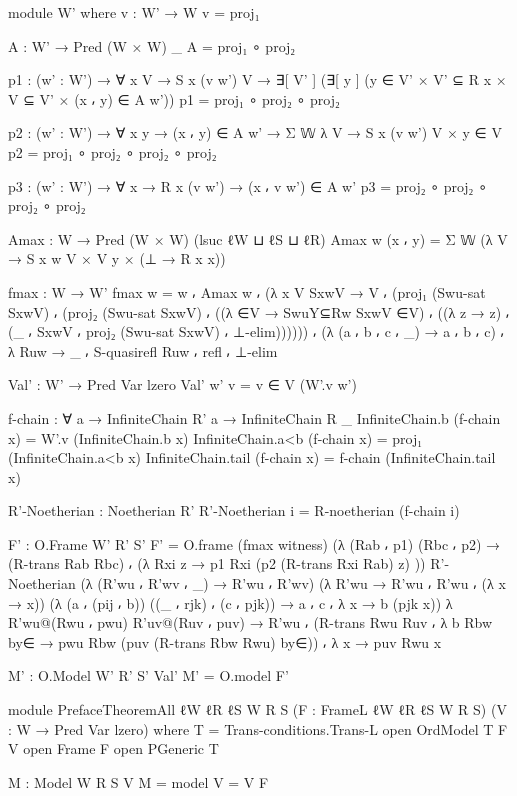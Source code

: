 \begin{spverbatim}
  module W' where
    v : W' → W
    v = proj₁

    A : W' → Pred (W × W) _
    A = proj₁ ∘ proj₂

    p1 : (w' : W')
      → ∀ {x V} → S x (v w') V
      → ∃[ V' ] (∃[ y ]
      (y ∈ V' × V' ⊆ R x × V ⊆ V' × (x ⸴ y) ∈ A w'))
    p1 = proj₁ ∘ proj₂ ∘ proj₂

    p2 : (w' : W') → ∀ {x y} → (x ⸴ y) ∈ A w'
      → Σ 𝕎 λ V → S x (v w') V × y ∈ V
    p2 = proj₁ ∘ proj₂ ∘ proj₂ ∘ proj₂

    p3 : (w' : W') → ∀ {x} → R x (v w') → (x ⸴ v w') ∈ A w'
    p3 = proj₂ ∘ proj₂ ∘ proj₂ ∘ proj₂

  Amax : W → Pred (W × W) (lsuc ℓW ⊔ ℓS ⊔ ℓR)
  Amax w (x ⸴ y) = Σ 𝕎 (λ V → S x w V × V y × (⊥ → R x x))

  fmax : W → W'
  fmax w = w ⸴ Amax w ⸴
       (λ { {x} {V} SxwV → V ⸴ (proj₁ (Swu-sat SxwV) ⸴ (proj₂ (Swu-sat SxwV)
         ⸴ ((λ {∈V → SwuY⊆Rw SxwV ∈V}) ⸴ ((λ z → z) ⸴ (_ ⸴ SxwV
         ⸴ proj₂ (Swu-sat SxwV) ⸴ ⊥-elim)))))})
    ⸴ (λ {(a ⸴ b ⸴ c ⸴ _) → a ⸴ b ⸴ c})
    ⸴ λ { Ruw → _ ⸴ S-quasirefl Ruw ⸴ refl ⸴ ⊥-elim}

  Val' : W' → Pred Var lzero
  Val' w' v = v ∈ V (W'.v w')

  f-chain : ∀ {a} → InfiniteChain R' a → InfiniteChain R _
  InfiniteChain.b (f-chain x) = W'.v (InfiniteChain.b x)
  InfiniteChain.a<b (f-chain x) = proj₁ (InfiniteChain.a<b x)
  InfiniteChain.tail (f-chain x) = f-chain (InfiniteChain.tail x)

  R'-Noetherian : Noetherian R'
  R'-Noetherian i = R-noetherian (f-chain i)

  F' : O.Frame W' R' S'
  F' = O.frame
    (fmax witness)
    (λ { (Rab ⸴ p1) (Rbc ⸴ p2) → (R-trans Rab Rbc) ⸴
      (λ {Rxi z → p1 Rxi (p2 (R-trans Rxi Rab) z) })})
    R'-Noetherian
    (λ { (R'wu ⸴ R'wv ⸴ _) → R'wu ⸴ R'wv})
    (λ {R'wu → R'wu ⸴ R'wu ⸴ (λ {x → x})})
    (λ { (a ⸴ (pij ⸴ b)) ((_ ⸴ rjk) ⸴ (c ⸴ pjk)) → a ⸴ c
      ⸴ λ {x → b (pjk x)}})
    λ {R'wu@(Rwu ⸴ pwu) R'uv@(Ruv ⸴ puv) → R'wu ⸴ (R-trans Rwu Ruv ⸴
      λ { {b} Rbw by∈ → pwu Rbw (puv (R-trans Rbw Rwu) by∈)})
    ⸴ λ {x → puv Rwu x}}

  M' : O.Model W' R' S' Val'
  M' = O.model F'

module PrefaceTheoremAll
  {ℓW ℓR ℓS}
  {W R S}
  (F : FrameL {ℓW} {ℓR} {ℓS} W R S)
  (V : W → Pred Var lzero)
  where
  T = Trans-conditions.Trans-L
  open OrdModel T F V
  open Frame F
  open PGeneric T

  M : Model W R S V
  M = model {V = V} F


\end{spverbatim}
